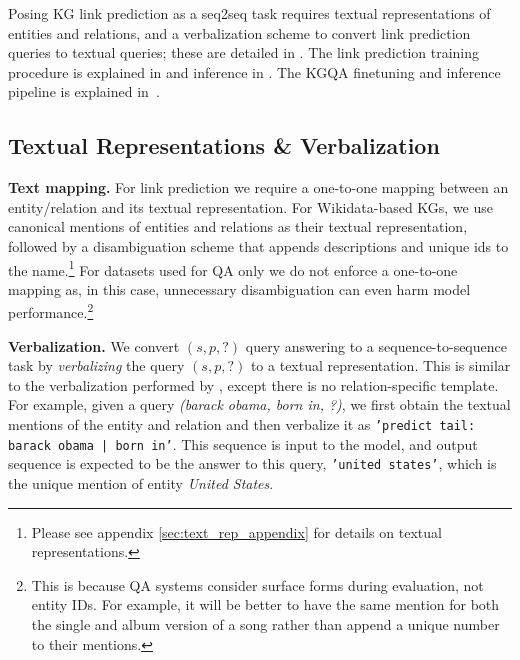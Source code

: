 \documentclass[11pt]{article}
\renewcommand\:{\colon} \newcommand{\sset}[1]{\left\{\,#1\,\right\}} \newcommand{\ssets}[1]{\left\{#1\right\}} \newcommand{\ssetn}[1]{\{\,#1\,\}}
\begin{document}
Posing KG link prediction as a seq2seq task requires textual representations of entities and relations, and a verbalization scheme to convert link prediction queries to textual queries; these are detailed in .
The link prediction training procedure is explained in  and inference in . The KGQA finetuning and inference pipeline is explained in~.














\subsection{Textual Representations \& Verbalization}
\label{sec:query_verbalization}
\textbf{Text mapping.} For link prediction we require a one-to-one mapping between an entity/relation and its textual representation.
For Wikidata-based KGs, we use canonical mentions of entities and relations as their textual representation, followed by a disambiguation scheme that appends descriptions and unique ids to the name.\footnote{Please see appendix \ref{sec:text_rep_appendix} for details on textual representations.}
For datasets used for QA only we do not enforce a one-to-one mapping as, in this case, unnecessary disambiguation can even harm model performance.\footnote{This is because QA systems consider surface forms during evaluation, not entity IDs. For example, it will be better to have the same mention for both the single and album version of a song rather than append a unique number to their mentions.}


\noindent\textbf{Verbalization.} We convert $(s,p,?)$ query answering to a sequence-to-sequence task by \textit{verbalizing} the query $(s,p,?)$ to a textual representation. This is similar to the verbalization performed by \citet{lama}, except there is no relation-specific template. For example, given a query \textit{(barack obama, born in, ?)}, we first obtain the textual mentions of the entity and relation and then verbalize it as 
\texttt{'predict tail: barack obama | born in'}. This sequence is input to the model, and output sequence is expected to be the answer to this query, \texttt{'united states'}, which is the unique mention of entity \textit{United States}. 
\end{document}
